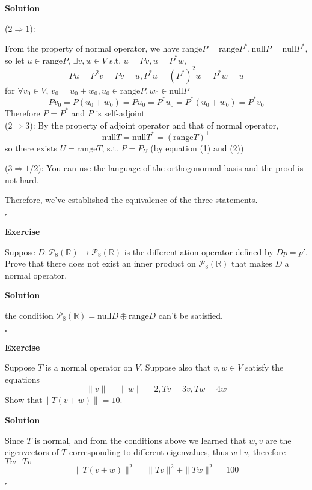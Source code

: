 \documentclass{article}
\newenvironment{exercise}{%
{\textbf{Exercise\\}
    }
}{
}
\newenvironment{solution}{%
{
    \textbf{Solution\\}
    }
}{
  \hfill $\square$ 
  \par\bigskip 
}
\newcommand{\RR}{\mathbb{R}}
\newcommand{\range}{\text{range}}
\newcommand{\n}{\text{null}}
\begin{document}
\begin{CJK}{UTF8}{gkai}
\begin{solution}
    ($2 \Rightarrow 1$):

    From the property of normal operator, we have $\range P = \range P^\ast, \n P = \n P^\ast$, so let $u \in \range P$, $\exists v,w \in V$ s.t. $u = Pv , u = P^\ast w$, 
    \[Pu = P^2 v = Pv = u, P^\ast u = (P^\ast)^2 w = P^\ast w = u\]
    for $\forall v_0 \in V$, $v_0 = u_0 + w_0, u_0 \in \range P , w_0 \in \n P$ 
    \[Pv_0 = P(u_0 + w_0) = Pu_0 = P^\ast u_0 = P^\ast(u_0 + w_0) = P^\ast v_0\] 
    Therefore $P = P^\ast$ and $P$ is self-adjoint\\ 

    ($2 \Rightarrow 3$):
    By the property of adjoint operator and that of normal operator,
    \begin{equation}
        \n T = \n T^\ast = (\range T)^\bot
    \end{equation}
    so there exists $U = \range T$, s.t. $P = P_U$ (by equation (1) and (2))

    ($3 \Rightarrow 1/2$):
    You can use the language of the orthogonormal basis and the proof is not hard.

Therefore, we've established the equivalence of the three statements.

\end{solution}

\begin{exercise}
    Suppose $D: \mathcal{P}_8(\RR) \to \mathcal{P}_8(\RR)$ is the differentiation operator defined by $Dp = p'$. Prove that there does not exist an inner product on $\mathcal{P}_8(\RR)$ that makes $D$ a normal operator.
\end{exercise}

\begin{solution}
    the condition $\mathcal{P}_8(\RR) = \n D \oplus \range D$ can't be satisfied.
\end{solution}

\begin{exercise}
    Suppose $T$ is a normal operator on $V$. Suppose also that $v,w \in  V$ satisfy the
    equations
    \[\|v\| = \|w\| = 2, Tv =3v, Tw=4w\]
    Show that$\|T(v + w)\| = 10$.   
\end{exercise}

\begin{solution}
    Since $T$ is normal, and from the conditions above we learned that $w,v$ are the eigenvectors of $T$ corresponding to different eigenvalues, thus $w \bot v$, therefore $T w \bot T v$
    \[\|T(v + w)\|^2 = \|Tv\|^2 + \|Tw\|^2 = 100 \]
\end{solution}


\end{CJK}
\end{document}
